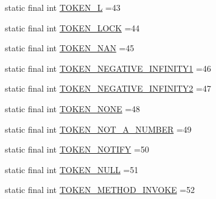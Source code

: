 \begin{DoxyCompactItemize}
\item 
static final int \hyperlink{classgov_1_1nasa_1_1jpf_1_1inspector_1_1server_1_1expression_1_1parser_1_1_expression_grammar_parser_a708c4d0340e63f64937ff7a9c9b527c4}{T\+O\+K\+E\+N\+\_\+L} =43
\item 
static final int \hyperlink{classgov_1_1nasa_1_1jpf_1_1inspector_1_1server_1_1expression_1_1parser_1_1_expression_grammar_parser_aaae00faf594b6a8ab3ccae13443bb55b}{T\+O\+K\+E\+N\+\_\+\+L\+O\+CK} =44
\item 
static final int \hyperlink{classgov_1_1nasa_1_1jpf_1_1inspector_1_1server_1_1expression_1_1parser_1_1_expression_grammar_parser_a8069c6fb9d6a244bd45f047b6fb7e735}{T\+O\+K\+E\+N\+\_\+\+N\+AN} =45
\item 
static final int \hyperlink{classgov_1_1nasa_1_1jpf_1_1inspector_1_1server_1_1expression_1_1parser_1_1_expression_grammar_parser_a57ba05269c0bd3323cd60d799f404400}{T\+O\+K\+E\+N\+\_\+\+N\+E\+G\+A\+T\+I\+V\+E\+\_\+\+I\+N\+F\+I\+N\+I\+T\+Y1} =46
\item 
static final int \hyperlink{classgov_1_1nasa_1_1jpf_1_1inspector_1_1server_1_1expression_1_1parser_1_1_expression_grammar_parser_ab417adbf89dc0b5716187cf20598132a}{T\+O\+K\+E\+N\+\_\+\+N\+E\+G\+A\+T\+I\+V\+E\+\_\+\+I\+N\+F\+I\+N\+I\+T\+Y2} =47
\item 
static final int \hyperlink{classgov_1_1nasa_1_1jpf_1_1inspector_1_1server_1_1expression_1_1parser_1_1_expression_grammar_parser_a580a0b6ec039745e3490c9a5ebfb425f}{T\+O\+K\+E\+N\+\_\+\+N\+O\+NE} =48
\item 
static final int \hyperlink{classgov_1_1nasa_1_1jpf_1_1inspector_1_1server_1_1expression_1_1parser_1_1_expression_grammar_parser_a76c92660cd85fa75e4f84293b7d2f9e1}{T\+O\+K\+E\+N\+\_\+\+N\+O\+T\+\_\+\+A\+\_\+\+N\+U\+M\+B\+ER} =49
\item 
static final int \hyperlink{classgov_1_1nasa_1_1jpf_1_1inspector_1_1server_1_1expression_1_1parser_1_1_expression_grammar_parser_a83faeba2555b1875227d01f8edbd5b00}{T\+O\+K\+E\+N\+\_\+\+N\+O\+T\+I\+FY} =50
\item 
static final int \hyperlink{classgov_1_1nasa_1_1jpf_1_1inspector_1_1server_1_1expression_1_1parser_1_1_expression_grammar_parser_a81c1cc064708bd9a1adce4bdc380b42c}{T\+O\+K\+E\+N\+\_\+\+N\+U\+LL} =51
\item 
static final int \hyperlink{classgov_1_1nasa_1_1jpf_1_1inspector_1_1server_1_1expression_1_1parser_1_1_expression_grammar_parser_a63bec4a39b74ca614759bfbd21877369}{T\+O\+K\+E\+N\+\_\+\+M\+E\+T\+H\+O\+D\+\_\+\+I\+N\+V\+O\+KE} =52

\end{DoxyCompactItemize}
